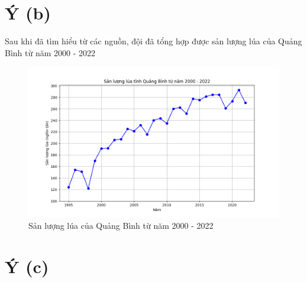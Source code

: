 \documentclass[12pt]{report}
\begin{document}
\newpage

\section{Ý (b)} %

\begin{flushleft}
	Sau khi đã tìm hiểu từ các nguồn, đội đã tổng hợp được sản lượng lúa của Quảng Bình từ năm 2000 - 2022
	\\[\baselineskip]

	\begin{figure}[!htbp]
		\centering
		\includegraphics[width = \textwidth]{images/sanluonglua.png}
		\caption{Sản lượng lúa của Quảng Bình từ năm 2000 - 2022}
	\end{figure}
\end{flushleft}

\newpage

\section{Ý (c)} %
\end{document}
